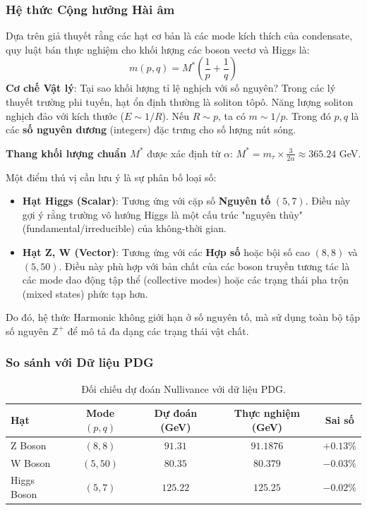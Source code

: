 \documentclass[a4paper,12pt]{article}
\begin{document}
\subsubsection{Hệ thức Cộng hưởng Hài âm}
Dựa trên giả thuyết rằng các hạt cơ bản là các mode kích thích của condensate, quy luật bán thực nghiệm cho khối lượng các boson vectơ và Higgs là:
\begin{equation}
 m(p,q) = M^* \left( \frac{1}{p} + \frac{1}{q} \right)
\end{equation}
\textbf{Cơ chế Vật lý}: Tại sao khối lượng tỉ lệ nghịch với số nguyên? Trong các lý thuyết trường phi tuyến, hạt ổn định thường là soliton tôpô. Năng lượng soliton nghịch đảo với kích thước ($E \sim 1/R$). Nếu $R \sim p$, ta có $m \sim 1/p$. Trong đó $p, q$ là các \textbf{số nguyên dương} (integers) đặc trưng cho số lượng nút sóng.

\textbf{Thang khối lượng chuẩn $M^*$} được xác định từ $\alpha$: $M^* = m_\tau \times \frac{3}{2\alpha} \approx 365.24$ GeV.

\begin{mdframed}[backgroundcolor=gray!10, frametitle={Lý thuyết về Số Nguyên tố và Hợp số (Primes vs Composites)}]
Một điểm thú vị cần lưu ý là sự phân bố loại số:
\begin{itemize}
    \item \textbf{Hạt Higgs (Scalar)}: Tương ứng với cặp số \textbf{Nguyên tố} $(5, 7)$. Điều này gợi ý rằng trường vô hướng Higgs là một cấu trúc "nguyên thủy" (fundamental/irreducible) của không-thời gian.
    \item \textbf{Hạt Z, W (Vector)}: Tương ứng với các \textbf{Hợp số} hoặc bội số cao $(8, 8)$ và $(5, 50)$. Điều này phù hợp với bản chất của các boson truyền tương tác là các mode dao động tập thể (collective modes) hoặc các trạng thái pha trộn (mixed states) phức tạp hơn.
\end{itemize}
Do đó, hệ thức Harmonic không giới hạn ở số nguyên tố, mà sử dụng toàn bộ tập số nguyên $\mathbb{Z}^+$ để mô tả đa dạng các trạng thái vật chất.
\end{mdframed}

\subsubsection{So sánh với Dữ liệu PDG}
\begin{table}[H]
\centering
\begin{tabular}{lcccc}
\toprule
\textbf{Hạt} & \textbf{Mode $(p,q)$} & \textbf{Dự đoán (GeV)} & \textbf{Thực nghiệm (GeV)} & \textbf{Sai số} \\
\midrule
Z Boson & $(8,8)$ & $91.31$ & $91.1876$ & $+0.13\%$ \\
W Boson & $(5,50)$ & $80.35$ & $80.379$ & $-0.03\%$ \\
Higgs Boson & $(5,7)$ & $125.22$ & $125.25$ & $-0.02\%$ \\
\bottomrule
\end{tabular}
\caption{Đối chiếu dự đoán Nullivance với dữ liệu PDG.}
\end{table}
\end{document}

